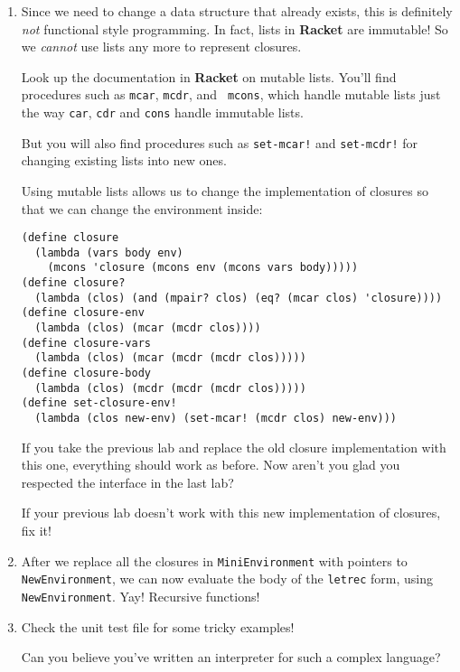 \documentclass[letterpaper,12pt]{article}
\begin{document}
\begin{enumerate}
\item Since we need to change a data structure that already exists, this is
  definitely {\em not} functional style programming.  In fact, lists in
  \textbf{Racket} are immutable!  So we \emph{cannot} use lists any more to
  represent closures.

  Look up the documentation in \textbf{Racket} on mutable lists.  You'll find
  procedures such as \texttt{mcar}, \texttt{mcdr}, and \texttt{ mcons}, which
  handle mutable lists just the way \texttt{car}, \texttt{cdr} and \texttt{cons}
  handle immutable lists.

  But you will also find procedures such as \texttt{set-mcar!} and
  \texttt{set-mcdr!} for changing existing lists into new ones.

  Using mutable lists allows us to change the implementation of closures so that
  we can change the environment inside:

\begin{Verbatim}[label=Mutable Closures]
(define closure
  (lambda (vars body env)
    (mcons 'closure (mcons env (mcons vars body)))))
(define closure?
  (lambda (clos) (and (mpair? clos) (eq? (mcar clos) 'closure))))
(define closure-env
  (lambda (clos) (mcar (mcdr clos))))
(define closure-vars
  (lambda (clos) (mcar (mcdr (mcdr clos)))))
(define closure-body
  (lambda (clos) (mcdr (mcdr (mcdr clos)))))
(define set-closure-env!
  (lambda (clos new-env) (set-mcar! (mcdr clos) new-env)))
\end{Verbatim}

  If you take the previous lab and replace the old closure implementation with
  this one, everything should work as before.  Now aren't you glad you respected
  the interface in the last lab?

  If your previous lab doesn't work with this new implementation of closures,
  fix it!

\item After we replace all the closures in \texttt{MiniEnvironment} with
  pointers to \texttt{NewEnvironment}, we can now evaluate the body of the
  \texttt{letrec} form, using \texttt{NewEnvironment}.  Yay!  Recursive
  functions!

\item Check the unit test file for some tricky examples!

  Can you believe you've written an interpreter for such a complex language?
\end{enumerate}
\end{document}
